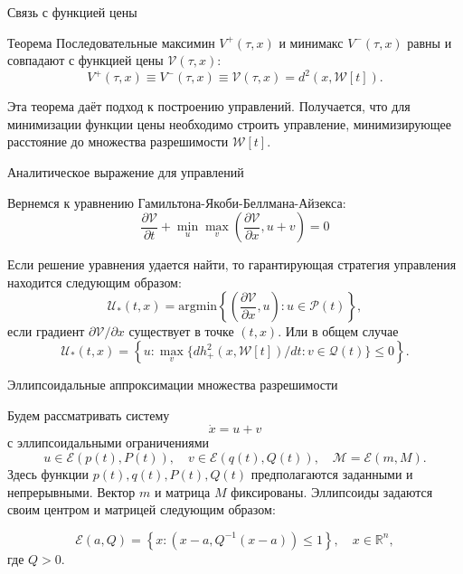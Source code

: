 \documentclass{beamer}
\begin{document}
\begin{frame}{Связь с функцией цены}

\begin{block}{Теорема}
Последовательные максимин \( V^+(\tau, x) \) и минимакс \( V^-(\tau, x) \) равны и совпадают с функцией
     цены \( \mathcal{V}(\tau,x) \):
    \[
        V^+(\tau, x) \equiv V^-(\tau, x) \equiv \mathcal{V}(\tau, x) = d^2(x, \mathcal{W}[t]).
    \]
\end{block}

Эта теорема даёт подход к построению управлений. Получается, что для минимизации функции цены необходимо строить управление, минимизирующее расстояние до множества разрешимости \( \mathcal{W}[t] \).

\end{frame}

\begin{frame}{Аналитическое выражение для управлений}


Вернемся к уравнению Гамильтона-Якоби-Беллмана-Айзекса:
\[
        \frac{\partial \mathcal{V}}{\partial t} + \min_u \max_v \left( \frac{\partial \mathcal{V}}
         {\partial x}, u + v \right) = 0
\]

Если решение уравнения удается найти, то гарантирующая стратегия управления находится следующим образом:
\begin{equation*}
    \mathcal{U}_*(t,x) = \mathrm{argmin} \left\{ \left( \frac{\partial \mathcal{V}}{\partial x},
     u \right) : u \in \mathcal{P}(t) \right\},
\end{equation*}
если градиент \( \partial \mathcal{V} / \partial x \) существует в точке \( (t, x) \). Или в общем случае
\begin{equation*}
    \mathcal{U}_*(t,x) = \left\{ u: \max_v \{ dh_+^2(x, \mathcal{W}[t]) / dt : v \in \mathcal{Q}(t) \} 
     \le 0 \right\}.
\end{equation*}
    
\end{frame}

\begin{frame}{Эллипсоидальные аппроксимации множества разрешимости}

Будем рассматривать систему
\begin{equation*}
    \dot{x} = u + v
\end{equation*}
с эллипсоидальными ограничениями
\begin{equation*}
    u \in \mathcal{E}(p(t), P(t)), \quad v \in \mathcal{E}(q(t), Q(t)), \quad \mathcal{M} = 
     \mathcal{E}(m, M).
\end{equation*}
Здесь функции \( p(t), q(t), P(t), Q(t) \) предполагаются заданными и непрерывными. Вектор \( m \) и
 матрица \( M \) фиксированы. Эллипсоиды задаются своим центром и матрицей следующим образом:
 
\begin{equation*}
    \mathcal{E}(a, Q) = \left\{ x : (x - a, Q^{-1}(x - a)) \le 1 \right\}, \quad x \in \mathbb{R}^n,
\end{equation*}
где \( Q > 0 \).
    
\end{frame}
\end{document}
